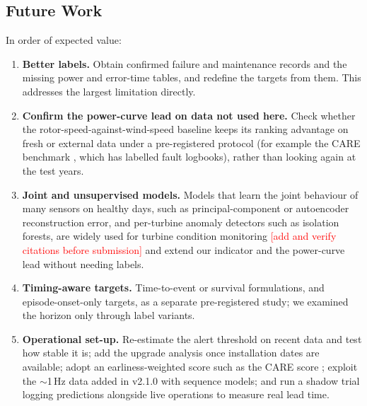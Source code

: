\documentclass[12pt,a4paper]{article}
\newcommand{\tbc}[1]{\textcolor{red}{[#1]}}
\begin{document}
	\subsection{Future Work}
	In order of expected value:
	\begin{enumerate}
		\item \textbf{Better labels.} Obtain confirmed failure and maintenance records and the missing power and error-time tables, and redefine the targets from them. This addresses the largest limitation directly.
		\item \textbf{Confirm the power-curve lead on data not used here.} Check whether the rotor-speed-against-wind-speed baseline keeps its ranking advantage on fresh or external data under a pre-registered protocol (for example the CARE benchmark \cite{gueck2024}, which has labelled fault logbooks), rather than looking again at the test years.
		\item \textbf{Joint and unsupervised models.} Models that learn the joint behaviour of many sensors on healthy days, such as principal-component or autoencoder reconstruction error, and per-turbine anomaly detectors such as isolation forests, are widely used for turbine condition monitoring \tbc{add and verify citations before submission} and extend our indicator and the power-curve lead without needing labels.
		\item \textbf{Timing-aware targets.} Time-to-event or survival formulations, and episode-onset-only targets, as a separate pre-registered study; we examined the horizon only through label variants.
		\item \textbf{Operational set-up.} Re-estimate the alert threshold on recent data and test how stable it is; add the upgrade analysis once installation dates are available; adopt an earliness-weighted score such as the CARE score \cite{gueck2024}; exploit the $\sim$1\,Hz data added in v2.1.0 \cite{hot_dataset_v2} with sequence models; and run a shadow trial logging predictions alongside live operations to measure real lead time.
	\end{enumerate}
\end{document}
